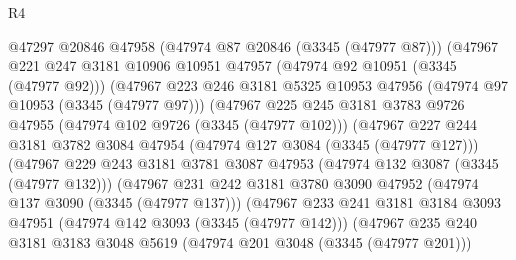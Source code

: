 \begin{lexlean}{R4}
\begin{coremodule}
                    @47297
                    @20846
                    @47958
                    (@47974 @87 @20846 (@3345 (@47977 @87)))
                    (@47967
                      @221
                      @247
                      @3181
                      @10906
                      @10951
                      @47957
                      (@47974 @92 @10951 (@3345 (@47977 @92)))
                      (@47967
                        @223
                        @246
                        @3181
                        @5325
                        @10953
                        @47956
                        (@47974 @97 @10953 (@3345 (@47977 @97)))
                        (@47967
                          @225
                          @245
                          @3181
                          @3783
                          @9726
                          @47955
                          (@47974 @102 @9726 (@3345 (@47977 @102)))
                          (@47967
                            @227
                            @244
                            @3181
                            @3782
                            @3084
                            @47954
                            (@47974 @127 @3084 (@3345 (@47977 @127)))
                            (@47967
                              @229
                              @243
                              @3181
                              @3781
                              @3087
                              @47953
                              (@47974 @132 @3087 (@3345 (@47977 @132)))
                              (@47967
                                @231
                                @242
                                @3181
                                @3780
                                @3090
                                @47952
                                (@47974 @137 @3090 (@3345 (@47977 @137)))
                                (@47967
                                  @233
                                  @241
                                  @3181
                                  @3184
                                  @3093
                                  @47951
                                  (@47974 @142 @3093 (@3345 (@47977 @142)))
                                  (@47967
                                    @235
                                    @240
                                    @3181
                                    @3183
                                    @3048
                                    @5619
                                    (@47974 @201 @3048 (@3345 (@47977 @201)))

\end{coremodule}
\end{lexlean}
